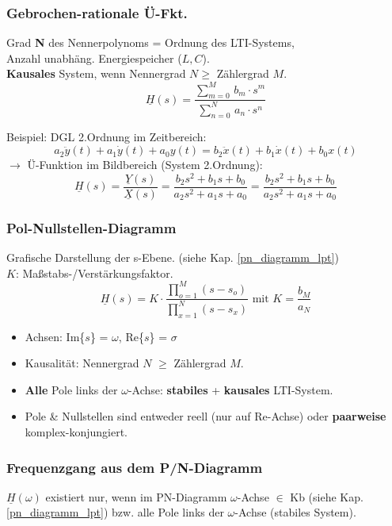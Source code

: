 \subsubsection{Gebrochen-rationale Ü-Fkt.}
{\small Grad \textbf{N} des Nennerpolynoms = Ordnung des LTI-Systems, \\ Anzahl unabhäng. Energiespeicher ($L, C$).\\
\textbf{Kausales} System, wenn Nennergrad $N\ge$ Z\"ahlergrad $M$}.
\[
\underline{H}(s)=\frac{\sum_{m=0}^{M} \, b_{m} \cdot s^{m}}{\sum_{n=0}^{N} \, a_{n} \cdot s^{n}}
\]

Beispiel: DGL 2.Ordnung im Zeitbereich:
\[
a_2\ddot{y}(t)+a_1\dot{y}(t)+a_0 y(t)=b_2\ddot{x}(t)+b_1\dot{x}(t)+b_0 x(t)
\]
$\rightarrow$ Ü-Funktion im Bildbereich (System 2.Ordnung):
\[
\underline{H}(s)=\frac{\underline{Y}(s)}{\underline{X}(s)}=\frac{b_2 s^2+b_1 s+b_0}{a_2 s^2 +a_1 s +a_0}
=\frac{b_2 s^2+b_1 s+b_0}{a_2 s^2 +a_1 s +a_0}
\]
\subsubsection{Pol-Nullstellen-Diagramm}\label{pn_diagramm_systeme}
{\small Grafische Darstellung der s-Ebene. (siehe Kap. \ref{pn_diagramm_lpt})\\
$K$: Maßstabs-/Verstärkungsfaktor.}
	\[
	 \underline{H}(s) = K \cdot \frac{\prod_{o=1}^{M} (s-s_o)}{\prod_{x=1}^{N} (s-s_x)} \text{ mit } K=\frac{b_M}{a_N}
	\]
\begin{itemize}
\item Achsen: Im\{$s$\} = $\omega$, \quad Re\{$s$\} = $\sigma$
\item Kausalität: Nennergrad $N$ $\ge$ Zählergrad $M$.
\item \textbf{Alle} Pole links der $\omega$-Achse: \textbf{stabiles} + \textbf{kausales} LTI-System.
\item Pole \& Nullstellen sind entweder reell (nur auf Re-Achse) oder \textbf{paarweise} komplex-konjungiert.
\end{itemize}
\subsubsection{Frequenzgang aus dem P/N-Diagramm}\label{fgang_pn}
      \small{$\underline{H}(\omega)$ existiert nur, wenn im PN-Diagramm $\omega$-Achse $\in$ Kb (siehe Kap. \ref{pn_diagramm_lpt}) bzw. alle Pole links der $\omega$-Achse (stabiles System).} \\
      
